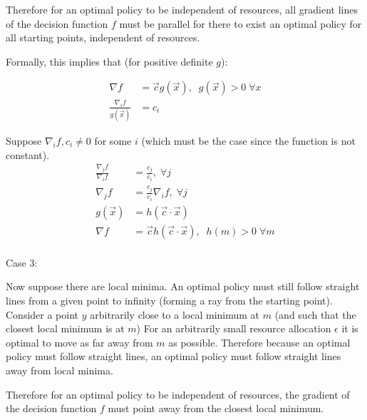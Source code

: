 Therefore for an optimal policy to be independent of resources, all gradient lines of the decision function $f$ must be parallel for there to exist an optimal policy for all starting points, independent of resources.

Formally, this implies that (for positive definite $g$):

\begin{align}
    \nabla f &= \vec{c} g(\vec x),\;\;g(\vec x) > 0 \; \forall x\\
    \frac{\nabla_i f}{g(\vec x)} &= c_i
\end{align}

Suppose $\nabla_i f, c_i \ne 0$ for some $i$ (which must be the case since the function is not constant).
\begin{align}
    \frac{\nabla_j f}{\nabla_i f} &= \frac{c_j}{c_i},\; \forall j \\
    \nabla_j f &= \frac{c_j}{c_i} \nabla_i f,\; \forall j\\
    g(\vec x) &= h(\vec c \cdot \vec x)\\
    \nabla f &= \vec{c} h(\vec{c} \cdot \vec x),\;\;h(m) > 0 \; \forall m\\
\end{align}


Case 3:

Now suppose there are local minima. An optimal policy must still follow straight lines from a given point to infinity (forming a ray from the starting point). Consider a point $y$ arbitrarily close to a local minimum at $m$ (and such that the closest local minimum is at $m$) For an arbitrarily small resource allocation $\epsilon$ it is optimal to move as far away from $m$ as possible. Therefore because an optimal policy must follow straight lines, an optimal policy must follow straight lines away from local minima.

Therefore for an optimal policy to be independent of resources, the gradient of the decision function $f$ must point away from the closest local minimum. 

